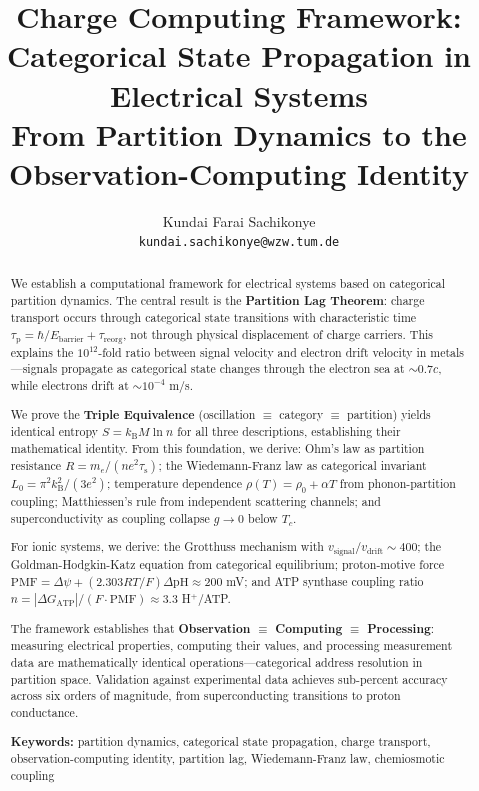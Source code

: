 \documentclass[twocolumn,10pt]{article}
\title{Charge Computing Framework:\\[0.5em]
\Large Categorical State Propagation in Electrical Systems\\[0.3em]
\large From Partition Dynamics to the Observation-Computing Identity}
\author{
Kundai Farai Sachikonye\\
\texttt{kundai.sachikonye@wzw.tum.de}
}
\theoremstyle{definition}
\theoremstyle{remark}
\newcommand{\kB}{k_{\mathrm{B}}}
\newcommand{\taup}{\tau_{\mathrm{p}}}
\newcommand{\taus}{\tau_{\mathrm{s}}}
\begin{document}
\maketitle

\begin{abstract}
We establish a computational framework for electrical systems based on categorical partition dynamics. The central result is the \textbf{Partition Lag Theorem}: charge transport occurs through categorical state transitions with characteristic time $\taup = \hbar/E_{\text{barrier}} + \tau_{\text{reorg}}$, not through physical displacement of charge carriers. This explains the $10^{12}$-fold ratio between signal velocity and electron drift velocity in metals---signals propagate as categorical state changes through the electron sea at $\sim 0.7c$, while electrons drift at $\sim 10^{-4}$ m/s.

We prove the \textbf{Triple Equivalence} (oscillation $\equiv$ category $\equiv$ partition) yields identical entropy $S = \kB M \ln n$ for all three descriptions, establishing their mathematical identity. From this foundation, we derive: Ohm's law as partition resistance $R = m_e/(ne^2\taus)$; the Wiedemann-Franz law as categorical invariant $L_0 = \pi^2\kB^2/(3e^2)$; temperature dependence $\rho(T) = \rho_0 + \alpha T$ from phonon-partition coupling; Matthiessen's rule from independent scattering channels; and superconductivity as coupling collapse $g \to 0$ below $T_c$.

For ionic systems, we derive: the Grotthuss mechanism with $v_{\text{signal}}/v_{\text{drift}} \sim 400$; the Goldman-Hodgkin-Katz equation from categorical equilibrium; proton-motive force $\text{PMF} = \Delta\psi + (2.303RT/F)\Delta\text{pH} \approx 200$ mV; and ATP synthase coupling ratio $n = |\Delta G_{\text{ATP}}|/(F \cdot \text{PMF}) \approx 3.3$ H$^+$/ATP.

The framework establishes that \textbf{Observation $\equiv$ Computing $\equiv$ Processing}: measuring electrical properties, computing their values, and processing measurement data are mathematically identical operations---categorical address resolution in partition space. Validation against experimental data achieves sub-percent accuracy across six orders of magnitude, from superconducting transitions to proton conductance.

\textbf{Keywords:} partition dynamics, categorical state propagation, charge transport, observation-computing identity, partition lag, Wiedemann-Franz law, chemiosmotic coupling
\end{abstract}
\end{document}
